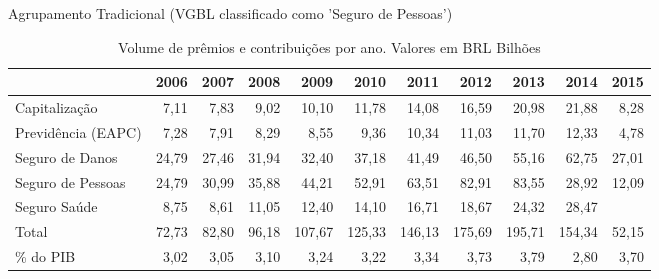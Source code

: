 \documentclass[../../relatorio.tex]{subfiles}
\begin{document}
Agrupamento Tradicional (VGBL classificado como 'Seguro de Pessoas')
\renewcommand\thetable{II.2}
\begin{table}[H]
\centering
\begin{tabular}{lrrrrrrrrrr}
  \hline
 & 2006 & 2007 & 2008 & 2009 & 2010 & 2011 & 2012 & 2013 & 2014 & 2015 \\ 
  \hline
Capitalização & 7,11 & 7,83 & 9,02 & 10,10 & 11,78 & 14,08 & 16,59 & 20,98 & 21,88 & 8,28 \\ 
  Previdência (EAPC) & 7,28 & 7,91 & 8,29 & 8,55 & 9,36 & 10,34 & 11,03 & 11,70 & 12,33 & 4,78 \\ 
  Seguro de Danos & 24,79 & 27,46 & 31,94 & 32,40 & 37,18 & 41,49 & 46,50 & 55,16 & 62,75 & 27,01 \\ 
  Seguro de Pessoas & 24,79 & 30,99 & 35,88 & 44,21 & 52,91 & 63,51 & 82,91 & 83,55 & 28,92 & 12,09 \\ 
  Seguro Saúde & 8,75 & 8,61 & 11,05 & 12,40 & 14,10 & 16,71 & 18,67 & 24,32 & 28,47 &  \\ 
   \hline
Total & 72,73 & 82,80 & 96,18 & 107,67 & 125,33 & 146,13 & 175,69 & 195,71 & 154,34 & 52,15 \\ 
   \hline
\% do PIB & 3,02 & 3,05 & 3,10 & 3,24 & 3,22 & 3,34 & 3,73 & 3,79 & 2,80 & 3,70 \\ 
   \hline
\end{tabular}
\caption{Volume de prêmios e contribuições por ano. Valores em BRL Bilhões} 
\end{table}\renewcommand\thetable{II.2.r.dez.}
\end{document}
